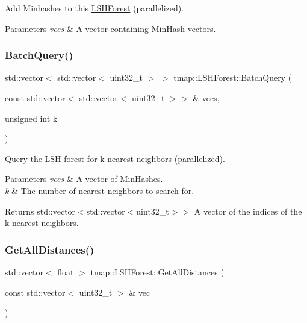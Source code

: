 Add Minhashes to this \hyperlink{classtmap_1_1LSHForest}{L\+S\+H\+Forest} (parallelized). 


\begin{DoxyParams}{Parameters}
{\em vecs} & A vector containing Min\+Hash vectors. \\
\hline
\end{DoxyParams}
\mbox{\label{classtmap_1_1LSHForest_adec697793677c79683490b776ae8642c}} 
\subsubsection{\texorpdfstring{Batch\+Query()}{BatchQuery()}}
{\footnotesize\ttfamily std\+::vector$<$ std\+::vector$<$ uint32\+\_\+t $>$ $>$ tmap\+::\+L\+S\+H\+Forest\+::\+Batch\+Query (\begin{DoxyParamCaption}\item[{const std\+::vector$<$ std\+::vector$<$ uint32\+\_\+t $>$$>$ \&}]{vecs,  }\item[{unsigned int}]{k }\end{DoxyParamCaption})}



Query the L\+SH forest for k-\/nearest neighbors (parallelized). 


\begin{DoxyParams}{Parameters}
{\em vecs} & A vector of Min\+Hashes. \\
\hline
{\em k} & The number of nearest neighbors to search for. \\
\hline
\end{DoxyParams}
\begin{DoxyReturn}{Returns}
std\+::vector$<$std\+::vector$<$uint32\+\_\+t$>$$>$ A vector of the indices of the k-\/nearest neighbors. 
\end{DoxyReturn}
\mbox{\label{classtmap_1_1LSHForest_a438a46f67fb257ae85c3dd16e8b194df}} 
\subsubsection{\texorpdfstring{Get\+All\+Distances()}{GetAllDistances()}}
{\footnotesize\ttfamily std\+::vector$<$ float $>$ tmap\+::\+L\+S\+H\+Forest\+::\+Get\+All\+Distances (\begin{DoxyParamCaption}\item[{const std\+::vector$<$ uint32\+\_\+t $>$ \&}]{vec }\end{DoxyParamCaption})}



